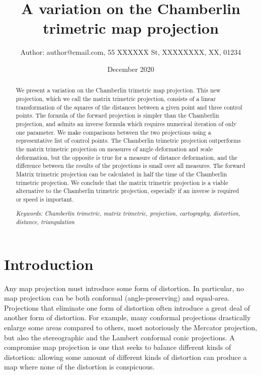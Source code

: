 \documentclass[]{interact}
\title{A variation on the Chamberlin trimetric map projection}
\author{Author: author@email.com, 55 XXXXXX St, XXXXXXXX, XX, 01234}
\date{December 2020}
\begin{document}
\maketitle
\begin{abstract}%
   We present a variation on the Chamberlin trimetric map projection. This new
   projection, which we call the matrix trimetric projection, consists of a
   linear transformation of the squares of the distances between a given point
   and three control points. The formula of the forward projection is simpler
   than the Chamberlin projection, and admits an inverse formula which requires
   numerical iteration of only one parameter. We make comparisons between the
   two projections using a representative list of control points. The Chamberlin
   trimetric projection outperforms the matrix trimetric projection on measures
   of angle deformation and scale deformation, but the opposite is true for a
   measure of distance deformation, and the difference between the results of
   the projections is small over all measures. The forward Matrix trimetric
   projection can be calculated in half the time of the Chamberlin trimetric
   projection. We conclude that the matrix
   trimetric projection is a viable alternative to the Chamberlin trimetric
   projection, especially if an inverse is required or speed is important.

   \textit{Keywords: Chamberlin trimetric, matrix trimetric, projection,
   cartography, distortion, distance, triangulation}

\end{abstract}

\section{Introduction}
Any map projection must introduce some form of distortion. In particular, no
map projection can be both conformal (angle-preserving) and equal-area.
Projections that eliminate one form of distortion often introduce a great deal
of another form of distortion. For example, many conformal projections
drastically enlarge some areas compared to others, most notoriously the
Mercator projection, but also the stereographic and the Lambert conformal conic
projections. \citep{snyder87} A compromise map projection is one that seeks to
balance different kinds of distortion: allowing some amount of different kinds
of distortion can produce a map where none of the distortion is conspicuous.
\end{document}

